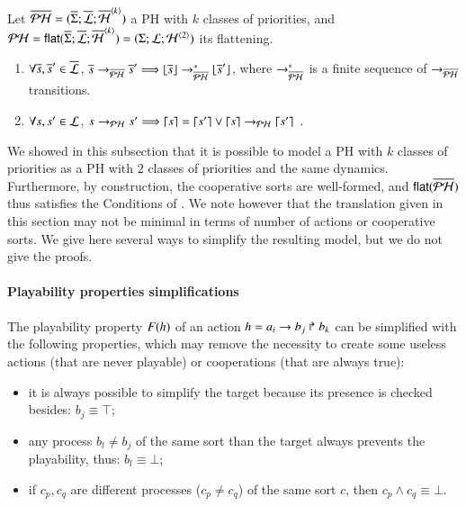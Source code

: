\begin{theorem}
\label{th:bisimPHP}
  Let $\ov{\PH} = (\ov{\PHs}; \ov{\PHl}; \ov{\PHa}^{\angles{k}})$ a PH with $k$ classes of priorities,
  and $\PH = \PHflat(\ov{\PHs}; \ov{\PHl}; \ov{\PHa}^{\angles{k}}) = (\PHs; \PHl; \PHa^{\angles{2}})$ its flattening.
  \begin{enumerate}
    \item \label{php2ph} $\forall \os, \os' \in \ov{\PHl}$,
      $\os \PHPtrans[\oPH] \os' \Longrightarrow \flats{\os} \PHPtrans[\oPH]^* \flats{\os'}$,
      where $\PHPtrans[\oPH]^*$ is a finite sequence of $\PHPtrans[\oPH]$ transitions.
    \item \label{ph2php} $\forall s, s' \in \PHl$,
      $s \PHPtrans s' \Longrightarrow \unflats{s} = \unflats{s'} \vee
      \unflats{s} \PHPtrans \unflats{s'} \enspace.$
  \end{enumerate}
\end{theorem}

We showed in this subsection that it is possible to model a PH with $k$ classes of priorities as a PH
with $2$ classes of priorities and the same dynamics.
Furthermore, by construction, the cooperative sorts are well-formed, and $\PHflat(\oPH)$
thus satisfies the Conditions of .
We note however that the translation given in this section may not be minimal in terms of number of actions
or cooperative sorts.
We give here several ways to simplify the resulting model, but we do not give the proofs.

\paragraph{Playability properties simplifications}
The playability property $\Fop{h}$ of an action $h = \PHhit{a_i}{b_j}{b_k}$ can be simplified with the following properties,
which may remove the necessity to create some useless actions (that are never playable) or cooperations (that are always true):
\begin{itemize}
  \item it is always possible to simplify the target because its presence is checked besides: $b_j \equiv \top$;
  \item any process $b_l \neq b_j$ of the same sort than the target always prevents the playability, thus: $b_l \equiv \bot$;
  \item if $c_p, c_q$ are different processes ($c_p \neq c_q$) of the same sort $c$, then $c_p \wedge c_q \equiv \bot$.
\end{itemize}

